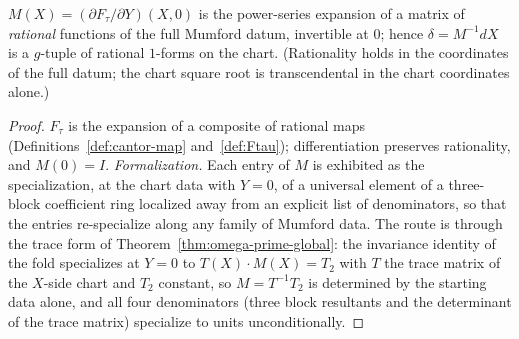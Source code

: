\begin{lemma}
\label{lem:delta-rational}
\leanok
{}
$M(X) = (\partial F_\tau/\partial Y)(X,0)$ is the power-series expansion of a matrix of
\emph{rational} functions of the full Mumford datum, invertible at $0$; hence
$\delta = M^{-1}dX$ is a $g$-tuple of rational $1$-forms on the chart. (Rationality
holds in the coordinates of the full datum; the chart square root is transcendental in
the chart coordinates alone.)
\end{lemma}
\begin{proof}
\leanok
$F_\tau$ is the expansion of a composite of rational maps
(Definitions~\ref{def:cantor-map} and~\ref{def:Ftau}); differentiation preserves
rationality, and $M(0) = I$. \emph{Formalization.} Each entry of $M$ is exhibited as
the specialization, at the chart data with $Y = 0$, of a universal element of a
three-block coefficient ring localized away from an explicit list of denominators, so
that the entries re-specialize along any family of Mumford data. The route is through
the trace form of Theorem~\ref{thm:omega-prime-global}: the invariance identity of the
fold specializes at $Y = 0$ to $T(X)\cdot M(X) = T_2$ with $T$ the trace matrix of the
$X$-side chart and $T_2$ constant, so $M = T^{-1}T_2$ is determined by the starting
data alone, and all four denominators (three block resultants and the determinant of
the trace matrix) specialize to units unconditionally.
\end{proof}

